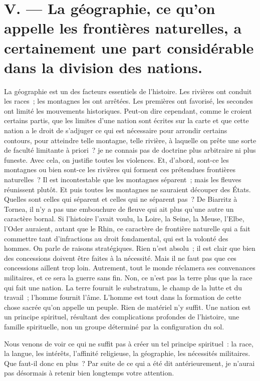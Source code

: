 \documentclass[french,twoside]{book} %
\newcommand\placeName[1]{#1}
\newcommand\chapterclose{} %
\begin{document}
\section[{V. — La géographie, ce qu’on appelle les frontières naturelles, a certainement une part considérable dans la division des nations.}]{V. — La géographie, ce qu’on appelle les frontières naturelles, a certainement une part considérable dans la division des nations.}
\noindent La géographie est un des facteurs essentiels de l’histoire. Les rivières ont conduit les races ; les montagnes les ont arrêtées. Les premières ont favorisé, les secondes ont limité les mouvements historiques. Peut-on dire cependant, comme le croient certains partis, que les limites d’une nation sont écrites sur la carte et que cette nation a le droit de s’adjuger ce qui est nécessaire pour arrondir certains contours, pour atteindre telle montagne, telle rivière, à laquelle on prête une sorte de faculté limitante à priori ? je ne connais pas de doctrine plus arbitraire ni plus funeste. Avec cela, on justifie toutes les violences. Et, d’abord, sont-ce les montagnes ou bien sont-ce les rivières qui forment ces prétendues frontières naturelles ? Il est incontestable que les montagnes séparent ; mais les fleuves réunissent plutôt. Et puis toutes les montagnes ne sauraient découper des États. Quelles sont celles qui séparent et celles qui ne séparent pas ? De {\placeName Biarritz} à {\placeName Tornea}, il n’y a pas une embouchure de fleuve qui ait plus qu’une autre un caractère bornal. Si l’histoire l’avait voulu, la {\placeName Loire}, la {\placeName Seine}, la {\placeName Meuse}, l’{\placeName Elbe}, l’{\placeName Oder} auraient, autant que le {\placeName Rhin}, ce caractère de frontière naturelle qui a fait commettre tant d’infractions au droit fondamental, qui est la volonté des hommes. On parle de raisons stratégiques. Rien n’est absolu ; il est clair que bien des concessions doivent être faites à la nécessité. Mais il ne faut pas que ces concessions aillent trop loin. Autrement, tout le monde réclamera ses convenances militaires, et ce sera la guerre sans fin. Non, ce n’est pas la terre plus que la race qui fait une nation. La terre fournit le substratum, le champ de la lutte et du travail ; l’homme fournit l’âme. L’homme est tout dans la formation de cette chose sacrée qu’on appelle un peuple. Rien de matériel n’y suffit. Une nation est un principe spirituel, résultant des complications profondes de l’histoire, une famille spirituelle, non un groupe déterminé par la configuration du sol.\par
Nous venons de voir ce qui ne suffit pas à créer un tel principe spirituel : la race, la langue, les intérêts, l’affinité religieuse, la géographie, les nécessités militaires. Que faut-il donc en plus ? Par suite de ce qui a été dit antérieurement, je n’aurai pas désormais à retenir bien longtemps votre attention.
\chapterclose
\end{document}
